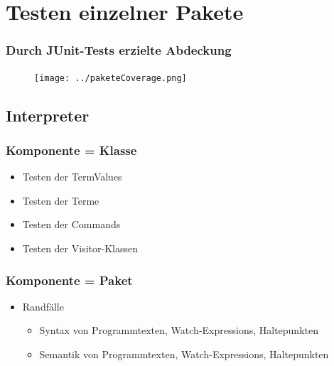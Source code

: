 \documentclass{beamer}
\begin{document}
\section{Testen einzelner Pakete} 

\begin{frame}
\frametitle{Durch JUnit-Tests erzielte Abdeckung}
\begin{figure}
\centering
\texttt{[image: ../paketeCoverage.png]}
\end{figure}
\end{frame}

\subsection{Interpreter}

\begin{frame}
\frametitle{Komponente = Klasse}
\begin{itemize}
    \item Testen der TermValues
    \item Testen der Terme
    \item Testen der Commands
    \item Testen der Visitor-Klassen
\end{itemize}
\end{frame}

\begin{frame}
\frametitle{Komponente = Paket}
\begin{itemize}
    \item Randfälle
    \begin{itemize}
        \item Syntax von Programmtexten, Watch-Expressions, Haltepunkten
        \item Semantik von Programmtexten, Watch-Expressions, Haltepunkten
    \end{itemize}
\end{itemize}
\end{frame}
\end{document}
